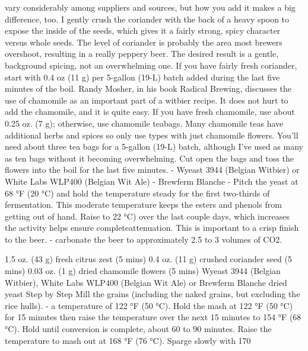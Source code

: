 \documentclass[a4paper,parskip=half]{scrartcl}
\begin{document}
vary considerably among suppliers and sources, but how you add it makes a big difference, too. I gently crush
the coriander with the back of a heavy spoon to expose the inside of the seeds, which gives it a fairly strong,
spicy character versus whole seeds. The level of coriander is probably the area most brewers overshoot,
resulting in a really peppery beer. The desired result is a gentle, background spicing, not an overwhelming one.
If you have fairly fresh coriander, start with 0.4 oz (11 g) per 5-gallon (19-L) batch added during the last five
minutes of the boil.
Randy Mosher, in his book Radical Brewing, discusses the use of chamomile as an important part of a witbier
recipe. It does not hurt to add the chamomile, and it is quite easy. If you have fresh chamomile, use about 0.25
oz. (7 g); otherwise, use chamomile teabags. Many chamomile teas have additional herbs and spices so only use
types with just chamomile flowers. You’ll need about three tea bags for a 5-gallon (19-L) batch, although I’ve
used as many as ten bags without it becoming overwhelming. Cut open the bags and toss the flowers into the
boil for the last five minutes.
- Wyeast 3944 (Belgian Witbier) or White Labs WLP400 (Belgian Wit Ale)
- Brewferm Blanche
- Pitch the yeast at 68 °F (20 °C) and hold the temperature steady for the first
two-thirds of fermentation. This moderate temperature keeps the esters and
phenols from getting out of hand. Raise to 22 °C) over
the last couple days, which increases the activity helps ensure completeattenuation. This is important to a crisp finish to the beer.
- carbonate the beer to approximately 2.5 to 3 volumes of CO2.

1.5 oz. (43 g) fresh citrus zest (5 mins)
0.4 oz. (11 g) crushed coriander seed (5 mins)
0.03 oz. (1 g) dried chamomile flowers (5 mins)
Wyeast 3944 (Belgian Witbier), White Labs WLP400 (Belgian Wit Ale) or Brewferm Blanche dried yeast
Step by Step
Mill the grains (including the naked grains, but excluding the rice hulls). 
- a temperature of 122 °F (50 °C). Hold the mash at 122 °F (50 °C) for 15
minutes then raise the temperature over the next 15 minutes to 154 °F (68 °C). Hold until conversion is
complete, about 60 to 90 minutes. Raise the temperature to mash out at 168 °F (76 °C). Sparge slowly with 170
\end{document}

